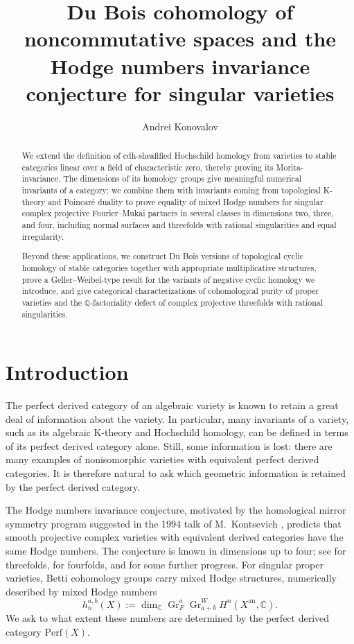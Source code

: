 \documentclass{amsart}
\author{Andrei Konovalov}
\title[Du Bois invariants and mixed Hodge numbers]{Du Bois cohomology of noncommutative spaces and the Hodge numbers invariance conjecture for singular varieties}
\theoremstyle{plain}
\theoremstyle{definition}
\newcommand{\bbC}{\mathbb{C}}
\newcommand{\bbQ}{\mathbb{Q}}
\newcommand{\Perf}{\mathrm{Perf}}
\DeclareMathOperator{\Gr}{Gr}
\newcommand{\an}{\mathrm{an}}
\begin{document}
\begin{abstract}
We extend the definition of cdh-sheafified Hochschild homology from varieties to stable categories linear over a field of characteristic zero, thereby proving its Morita-invariance. The dimensions of its homology groups give meaningful numerical invariants of a category; we combine them with invariants coming from topological K-theory and Poincar\'e duality to prove equality of mixed Hodge numbers for singular complex projective Fourier--Mukai partners in several classes in dimensions two, three, and four, including normal surfaces and threefolds with rational singularities and equal irregularity.

Beyond these applications, we construct Du Bois versions of topological cyclic homology of stable categories together with appropriate multiplicative structures, prove a Geller--Weibel-type result for the variants of negative cyclic homology we introduce, and give categorical characterizations of cohomological purity of proper varieties and the $\bbQ$-factoriality defect of complex projective threefolds with rational singularities.
\end{abstract}
\maketitle

\tableofcontents

\section{Introduction}

The perfect derived category of an algebraic variety is known to retain a great deal of information about the variety.
In particular, many invariants of a variety, such as its algebraic K-theory and Hochschild homology, can be defined in terms of its perfect derived category alone. Still, some information is lost:
there are many examples of nonisomorphic varieties with equivalent perfect derived categories. It is therefore natural to ask which geometric information is retained by the perfect derived category.

The Hodge numbers invariance conjecture, motivated by the homological mirror symmetry program suggested in the 1994 talk of M.~Kontsevich \cite{Kon95}, predicts that smooth projective complex varieties with equivalent derived categories have the same Hodge numbers. The conjecture is known in dimensions up to four; see \cite{PS11} for threefolds, \cite{Ant26} for fourfolds, and \cite{Abu26} for some further progress. For singular proper varieties, Betti cohomology groups carry mixed Hodge structures, numerically described by mixed Hodge numbers
\[
h_n^{a,b}(X):=
\dim_{\bbC}\Gr_F^a\Gr_{a+b}^W H^n(X^{\an},\bbC).
\]
We ask to what extent these numbers are determined by the perfect derived category $\Perf(X)$.
\end{document}
